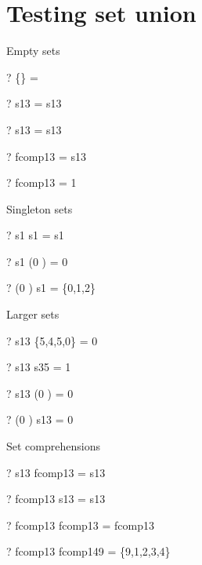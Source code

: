 \documentclass{article}
\begin{document}
\section{Testing set union}
Empty sets
\begin{zed} \vdash?  \{\}     \cup \emptyset[\nat] = \emptyset \end{zed}
\begin{zed} \vdash?  \emptyset \cup s13         = s13 \end{zed}
\begin{zed} \vdash?  s13       \cup \emptyset   = s13 \end{zed}
\begin{zed} \vdash?  \emptyset \cup fcomp13     = s13 \end{zed}
\begin{zed} \vdash?  fcomp13   \cup \emptyset   = 1  \end{zed}
Singleton sets
\begin{zed} \vdash?  s1        \cup s1          = s1 \end{zed}
\begin{zed} \vdash?  s1        \cup (0 ) = 0  \end{zed}
\begin{zed} \vdash?  (0 ) \cup s1        = \{0,1,2\} \end{zed}
Larger sets
\begin{zed} \vdash?  s13       \cup \{5,4,5,0\} = 0  \end{zed}
\begin{zed} \vdash?  s13       \cup s35         = 1  \end{zed}
\begin{zed} \vdash?  s13       \cup (0 ) = 0  \end{zed}
\begin{zed} \vdash?  (0 ) \cup s13       = 0  \end{zed}
Set comprehensions
\begin{zed} \vdash?  s13       \cup fcomp13     = s13 \end{zed}
\begin{zed} \vdash?  fcomp13   \cup s13         = s13 \end{zed}
\begin{zed} \vdash?  fcomp13   \cup fcomp13     = fcomp13 \end{zed}
\begin{zed} \vdash?  fcomp13   \cup fcomp149    = \{9,1,2,3,4\} \end{zed}
\end{document}
